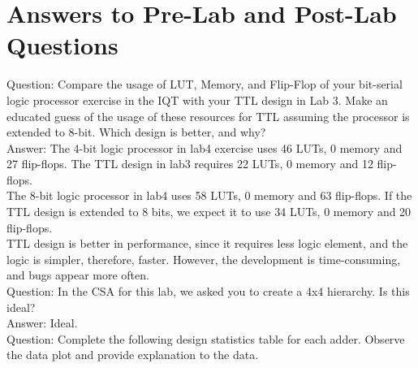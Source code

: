 \documentclass[12pt]{article}
\begin{document}
\section{Answers to Pre-Lab and Post-Lab Questions}
Question: Compare the usage of LUT, Memory, and Flip-Flop of your bit-serial logic processor exercise in the IQT with your TTL design in Lab 3. Make an educated guess of the usage of these resources for TTL assuming the processor is extended to 8-bit. Which design is better, and why? \\

Answer: The 4-bit logic processor in lab4 exercise uses 46 LUTs, 0 memory and 27 flip-flops. The TTL design in lab3 requires 22 LUTs, 0 memory and 12 flip-flops. \\
The 8-bit logic processor in lab4 uses 58 LUTs, 0 memory and 63 flip-flops. If the TTL design is extended to 8 bits, we expect it to use 34 LUTs, 0 memory and 20 flip-flops. \\
TTL design is better in performance, since it requires less logic element, and the logic is simpler, therefore, faster. However, the development is time-consuming, and bugs appear more often. \\

Question: In the CSA for this lab, we asked you to create a 4x4 hierarchy. Is this ideal? \\

Answer: Ideal. \\

Question: Complete the following design statistics table for each adder. Observe the data plot and provide explanation to the data. 

\begin{table}[H]
    \centering
    \caption{Design statistics table for CRA, CLA and CSA.}
\end{table}
\end{document}
